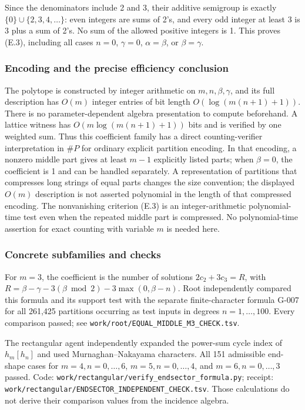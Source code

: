 \documentclass[
  10pt,
]{article}
\begin{document}
Since the denominators include 2 and 3, their additive semigroup is
exactly \(\{0\}\cup\{2,3,4,\ldots\}\): even integers are sums of 2's,
and every odd integer at least 3 is 3 plus a sum of 2's. No sum of the
allowed positive integers is 1. This proves (E.3), including all cases
\(n=0\), \(\gamma=0\), \(\alpha=\beta\), or \(\beta=\gamma\).

\subsubsection{Encoding and the precise efficiency
conclusion}\label{encoding-and-the-precise-efficiency-conclusion}

The polytope is constructed by integer arithmetic on
\(m,n,\beta,\gamma\), and its full description has \(O(m)\) integer
entries of bit length \(O(\log(m(n+1)+1))\). There is no
parameter-dependent algebra presentation to compute beforehand. A
lattice witness has \(O(m\log(m(n+1)+1))\) bits and is verified by one
weighted sum. Thus this coefficient family has a direct
counting-verifier interpretation in \(\#P\) for ordinary explicit
partition encoding. In that encoding, a nonzero middle part gives at
least \(m-1\) explicitly listed parts; when \(\beta=0\), the coefficient
is 1 and can be handled separately. A representation of partitions that
compresses long strings of equal parts changes the size convention; the
displayed \(O(m)\) description is not asserted polynomial in the length
of that compressed encoding. The nonvanishing criterion (E.3) is an
integer-arithmetic polynomial-time test even when the repeated middle
part is compressed. No polynomial-time assertion for exact counting with
variable \(m\) is needed here.

\subsubsection{Concrete subfamilies and
checks}\label{concrete-subfamilies-and-checks}

For \(m=3\), the coefficient is the number of solutions \(2c_2+3c_3=R\),
with \(R=\beta-\gamma-3(\beta\bmod2)-3\max(0,\beta-n)\). Root
independently compared this formula and its support test with the
separate finite-character formula G-007 for all 261,425 partitions
occurring as test inputs in degrees \(n=1,\ldots,100\). Every comparison
passed; see
\texttt{\small work/\allowbreak{}root/\allowbreak{}EQUAL\_\allowbreak{}MIDDLE\_\allowbreak{}M3\_\allowbreak{}CHECK.tsv}.

The rectangular agent independently expanded the power-sum cycle index
of \(h_m[h_n]\) and used Murnaghan--Nakayama characters. All 151
admissible end-shape cases for \(m=4,n=0,\ldots,6\),
\(m=5,n=0,\ldots,4\), and \(m=6,n=0,\ldots,3\) passed. Code:
\texttt{\small work/\allowbreak{}rectangular/\allowbreak{}verify\_\allowbreak{}endsector\_\allowbreak{}formula.py};
receipt:
\texttt{\small work/\allowbreak{}rectangular/\allowbreak{}ENDSECTOR\_\allowbreak{}INDEPENDENT\_\allowbreak{}CHECK.tsv}.
Those calculations do not derive their comparison values from the
incidence algebra.
\end{document}
